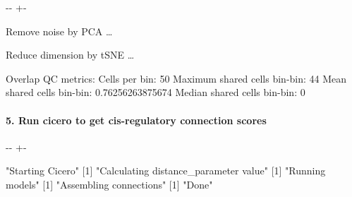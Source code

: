 \documentclass[letterpaper,10pt,english]{sphinxmanual}
\newlength\nbsphinxcodecellspacing
\begin{document}
{

\kern-\sphinxverbatimsmallskipamount\kern-\baselineskip
\kern+\FrameHeightAdjust\kern-\fboxrule
\vspace{\nbsphinxcodecellspacing}

\begin{sphinxVerbatim}[commandchars=\\\{\}]
Remove noise by PCA {\ldots}

Reduce dimension by tSNE {\ldots}

Overlap QC metrics:
Cells per bin: 50
Maximum shared cells bin-bin: 44
Mean shared cells bin-bin: 0.76256263875674
Median shared cells bin-bin: 0

\end{sphinxVerbatim}
}


\paragraph{5. Run cicero to get cis-regulatory connection scores}
\label{\detokenize{notebooks/01_ATAC-seq_data_processing/option1_scATAC-seq_data_analysis_with_cicero/01_atacdata_to_cicero:5.-Run-cicero-to-get-cis-regulatory-connection-scores}}
{
\begin{sphinxVerbatim}[commandchars=\\\{\}]
\llap{\color{nbsphinxin}[11]:\,\hspace{\fboxrule}\hspace{\fboxsep}}
  

    

\end{sphinxVerbatim}
}

{

\kern-\sphinxverbatimsmallskipamount\kern-\baselineskip
\kern+\FrameHeightAdjust\kern-\fboxrule
\vspace{\nbsphinxcodecellspacing}

\begin{sphinxVerbatim}[commandchars=\\\{\}]
[1] "Starting Cicero"
[1] "Calculating distance\_parameter value"
[1] "Running models"
[1] "Assembling connections"
[1] "Done"
\end{sphinxVerbatim}
}
\end{document}
